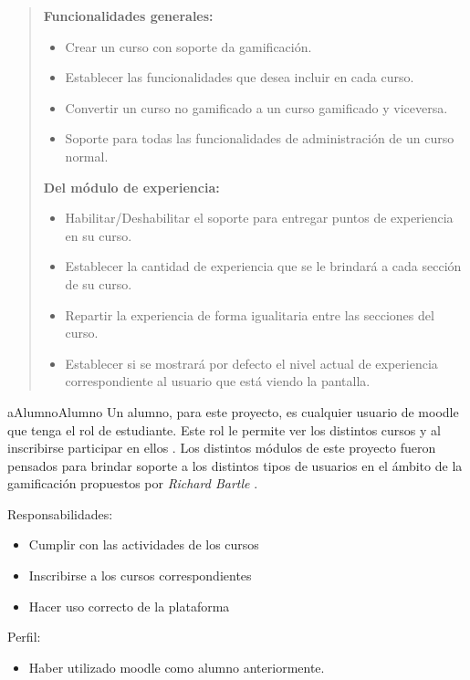     \begin{quote}
    {\bf Funcionalidades generales:}
        \begin{itemize}
        \item Crear un curso con soporte da gamificación.
        \item Establecer las funcionalidades que desea incluir en cada curso.
        \item Convertir un curso no gamificado a un curso gamificado y viceversa.
        \item Soporte para todas las funcionalidades de administración de un curso
              normal.
        \end{itemize}

    {\bf Del módulo de experiencia:}
        \begin{itemize}
        \item Habilitar/Deshabilitar el soporte para entregar puntos de experiencia
              en su curso.
        \item Establecer la cantidad de experiencia que se le brindará a cada
              sección de su curso.
        \item Repartir la experiencia de forma igualitaria entre las secciones del
              curso.
        \item Establecer si se mostrará por defecto el nivel actual de experiencia
              correspondiente al usuario que está viendo la pantalla.
        \end{itemize}

    \end{quote}


    \begin{actor}{aAlumno}{Alumno}{%
    Un alumno, para este proyecto, es cualquier usuario de moodle que tenga el rol de
    estudiante. Este rol le permite ver los distintos cursos y al inscribirse participar
    en ellos \cite{MoodleRolEstudiante}. Los distintos módulos de este proyecto fueron pensados
    para brindar soporte a los distintos tipos de usuarios en el ámbito de la gamificación
    propuestos por {\it Richard Bartle} \cite{BartleUsuarios}.\\}

    \item[Responsabilidades:] \hfill
        \begin{itemize}
        \item Cumplir con las actividades de los cursos
        \item Inscribirse a los cursos correspondientes
        \item Hacer uso correcto de la plataforma
        \end{itemize}

    \item[Perfil:] \hfill
        \begin{itemize}
        \item Haber utilizado moodle como alumno anteriormente.
        \end{itemize}
    \end{actor}

